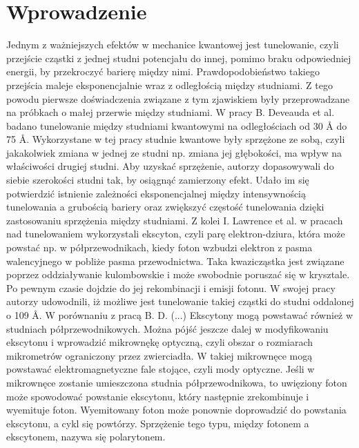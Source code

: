 \documentclass[licencjacka]{pracamgr}
\begin{document}
\chapter*{Wprowadzenie}
%
Jednym z ważniejszych efektów w mechanice kwantowej jest tunelowanie, czyli przejście cząstki z jednej studni potencjału do innej, pomimo braku odpowiedniej energii, by przekroczyć barierę między nimi. Prawdopodobieństwo takiego przejścia maleje eksponencjalnie wraz z odległością między studniami. Z tego powodu pierwsze doświadczenia związane z tym zjawiskiem były przeprowadzane na próbkach o małej przerwie między studniami. W pracy B. Deveauda et al. \cite{1990} badano tunelowanie między studniami kwantowymi na odległościach od 30 \r{A} do 75 \r{A}. Wykorzystane w tej pracy studnie kwantowe były sprzężone ze sobą, czyli jakakolwiek zmiana w jednej ze studni np. zmiana jej głębokości, ma wpływ na właściwości drugiej studni. Aby uzyskać sprzężenie, autorzy dopasowywali do siebie szerokości studni tak, by osiągnąć zamierzony efekt. Udało im się potwierdzić istnienie zależności eksponencjalnej między intensywnością tunelowania a grubością bariery oraz zwiększyć częstość tunelowania dzięki zastosowaniu sprzężenia między studniami. Z kolei I. Lawrence et al. \cite{1994} w pracach nad tunelowaniem wykorzystali ekscyton, czyli parę elektron-dziura, która może powstać np. w półprzewodnikach, kiedy foton wzbudzi elektron z pasma walencyjnego w pobliże pasma przewodnictwa. Taka kwazicząstka jest związane poprzez oddziaływanie kulombowskie i może swobodnie poruszać się w krysztale. Po pewnym czasie dojdzie do jej rekombinacji i emisji fotonu. W swojej pracy autorzy udowodnili, iż możliwe jest tunelowanie takiej cząstki do studni oddalonej o 109 \r{A}. W porównaniu z pracą B. D. (...) Ekscytony mogą powstawać również w studniach półprzewodnikowych. %
Można pójść jeszcze dalej w modyfikowaniu ekscytonu i wprowadzić mikrownękę optyczną, czyli obszar o rozmiarach mikrometrów ograniczony przez zwierciadła. W takiej mikrownęce mogą powstawać elektromagnetyczne fale stojące, czyli mody optyczne. Jeśli w mikrownęce zostanie umieszczona studnia półprzewodnikowa, to uwięziony foton może spowodować powstanie ekscytonu, który następnie zrekombinuje i wyemituje foton. Wyemitowany foton może ponownie doprowadzić do powstania ekscytonu, a cykl się powtórzy. Sprzężenie tego typu, między fotonem a ekscytonem, nazywa się polarytonem. %
\end{document}
